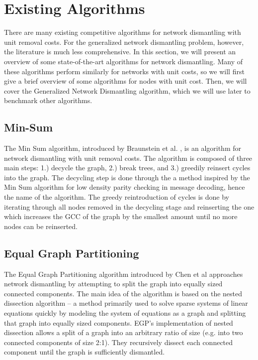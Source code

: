 \documentclass{article}
\begin{document}
\section{Existing Algorithms}
\null\quad There are many existing competitive algorithms for network dismantling with unit removal costs. 
For the generalized network dismantling problem, however, the literature is much less comprehensive. 
In this section, we will present an overview of some state-of-the-art algorithms for network dismantling.
Many of these algorithms perform similarly for networks with unit costs, so we will first give a brief overview of some algorithms for nodes with unit cost. 
Then, we will cover the Generalized Network Dismantling algorithm, which we will use later to benchmark other algorithms.

\subsection{Min-Sum}
The Min Sum algorithm, introduced by Braunstein et al. \cite{braunstein}, is an algorithm for network dismantling with unit removal costs. 
The algorithm is composed of three main steps: 1.) decycle the graph, 2.) break trees, and 3.) greedily reinsert cycles into the graph. 
The decycling step is done through the a method inspired by the Min Sum algorithm for low density parity checking in message decoding, hence the name of the algorithm. 
The greedy reintroduction of cycles is done by iterating through all nodes removed in the decycling stage and reinserting the one which increases the GCC of the graph by the smallest amount until no more nodes can be reinserted. 

\subsection{Equal Graph Partitioning}
The Equal Graph Partitioning algorithm introduced by Chen et al \cite{egp} approaches network dismantling by attempting to split the graph into equally sized connected components. 
The main idea of the algorithm is based on the nested dissection algorithm -- a method primarily used to solve sparse systems of linear equations quickly by modeling the system of equations as a graph and splitting that graph into equally sized components. 
EGP's implementation of nested dissection allows a split of a graph into an arbitrary ratio of size (e.g. into two connected components of size 2:1). 
They recursively dissect each connected component until the graph is sufficiently dismantled. 
\end{document}
